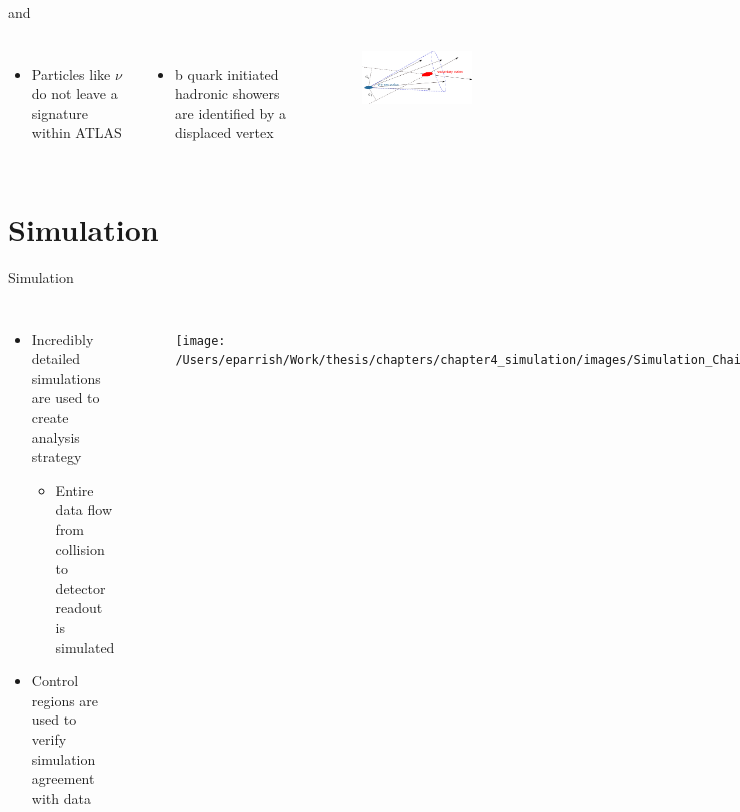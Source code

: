 \documentclass[aspectratio=169,xcolor=table]{beamer}
\begin{document}
    \begin{frame}[t]{\Etm and \bjets}
     \begin{columns}
        \begin{itemize}
          \item Particles like $\nu$ do not leave a signature within ATLAS
        \end{itemize}

      \begin{itemize}
        \item b quark initiated hadronic showers are identified by a displaced vertex
      \end{itemize}
      \begin{figure}[!ht]
      \centering
      \includegraphics[width=.5\textwidth,keepaspectratio=true]{chapters/chapter5_eventreconnstruction/images/b-jet-schetch.png}
      \end{figure}
      \end{columns}
    \end{frame}

\section{Simulation }
  
  \begin{frame}[t]{Simulation}
     \begin{columns}[t]
        \begin{itemize}
          \item Incredibly detailed simulations are used to create analysis strategy
            \begin{itemize}
              \item Entire data flow from collision to detector readout is simulated
            \end{itemize}
          \item Control regions are used to verify simulation agreement with data
        \end{itemize}

        \begin{figure}
        \centering
        \texttt{[image: /Users/eparrish/Work/thesis/chapters/chapter4\_simulation/images/Simulation\_Chain.png]}
        \caption{\tiny \cite{Wanotayaroj:2242196}}
        \end{figure}
      \end{columns}
  \end{frame}
\end{document}
